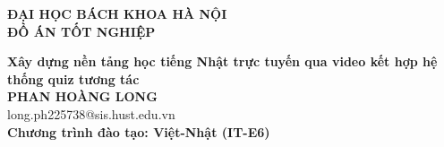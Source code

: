 \documentclass[DoAn.tex]{subfiles}
\begin{document}
\begin{titlepage}
\thispagestyle{empty}
\begin{center}

{\textbf{\large{ĐẠI HỌC BÁCH KHOA HÀ NỘI}}}\\[2.5cm]

{\textbf{\huge{ ĐỒ ÁN TỐT NGHIỆP}}}\\[1cm]
{\textbf{\Large{Xây dựng nền tảng học tiếng Nhật trực tuyến qua video kết hợp hệ thống quiz tương tác}}\\[1cm]

{\textbf{\large{PHAN HOÀNG LONG}}}\\
{\large{long.ph225738@sis.hust.edu.vn}}\\[0.5cm]

{\textbf{\large{Chương trình đào tạo: Việt-Nhật (IT-E6)
}}}\\

\vspace{2cm}
\begin{table}[H]
\centering
{}
\end{table}}
\end{center}

\end{titlepage}
\end{document}
